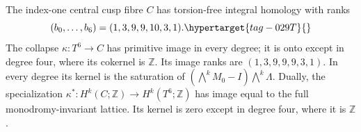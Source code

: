 \begin{theorem}\hypertarget{tag-02QK}{}\label{night:P1.11}\hypertarget{tag-02M6}{}\label{maps:src:E.1.3}
The index-one central cusp fibre $C$ has torsion-free integral homology
with ranks
\begin{equation}
 (b_0,\ldots,b_6)=(1,3,9,9,10,3,1).
 \hypertarget{tag-029T}{}\label{maps:eq:E.6}
\end{equation}
The collapse $\kappa:T^6\to C$ has primitive image in every degree;
it is onto except in degree four, where its cokernel is $\mathbb Z$.
Its image ranks are $(1,3,9,9,9,3,1)$.
In every degree its kernel is the saturation of
$(\bigwedge^kM_0-I)\bigwedge^k\Lambda$.
Dually, the specialization
$\kappa^*:H^k(C;\mathbb Z)\to H^k(T^6;\mathbb Z)$
has image equal to the full monodromy-invariant lattice.
Its kernel is zero except in degree four, where it is $\mathbb Z$.
\end{theorem}
